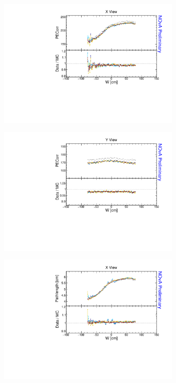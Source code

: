 \begin{figure}[!ht]
\begin{subfigure}{0.495\textwidth}
  \end{subfigure}
  \begin{subfigure}{0.495\textwidth}
    \includegraphics[width=\linewidth]{essentialsec_tb/pecorr_w_x.pdf}
  \end{subfigure}
  \begin{subfigure}{0.495\textwidth}
    \includegraphics[width=\linewidth]{essentialsec_tb/pecorr_w_y.pdf}
  \end{subfigure}
  \begin{subfigure}{0.495\textwidth}
    \includegraphics[width=\linewidth]{essentialsec_tb/cm_w_x.pdf}

\end{subfigure}
\end{figure}
